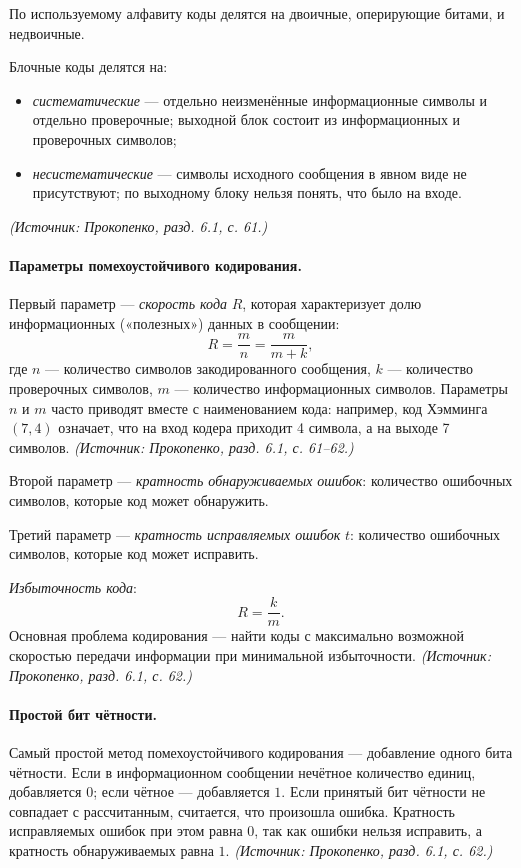 \documentclass[a4paper,12pt]{article}
\begin{document}
По используемому алфавиту коды делятся на двоичные, оперирующие битами, и недвоичные.

Блочные коды делятся на:
\begin{itemize}
\item \emph{систематические} — отдельно неизменённые информационные символы и отдельно проверочные; выходной блок состоит из информационных и проверочных символов;
\item \emph{несистематические} — символы исходного сообщения в явном виде не присутствуют; по выходному блоку нельзя понять, что было на входе.
\end{itemize}
\textit{(Источник: Прокопенко, разд. 6.1, с. 61.)}

\paragraph{Параметры помехоустойчивого кодирования.}
Первый параметр — \emph{скорость кода} \(R\), которая характеризует долю информационных («полезных») данных в сообщении:
\[
R=\frac{m}{n}=\frac{m}{m+k},
\]
где \(n\) — количество символов закодированного сообщения, \(k\) — количество проверочных символов, \(m\) — количество информационных символов. Параметры \(n\) и \(m\) часто приводят вместе с наименованием кода: например, код Хэмминга \((7,4)\) означает, что на вход кодера приходит 4 символа, а на выходе 7 символов.
\textit{(Источник: Прокопенко, разд. 6.1, с. 61--62.)}

Второй параметр — \emph{кратность обнаруживаемых ошибок}: количество ошибочных символов, которые код может обнаружить.

Третий параметр — \emph{кратность исправляемых ошибок} \(t\): количество ошибочных символов, которые код может исправить.

\emph{Избыточность кода}:
\[
R=\frac{k}{m}.
\]
Основная проблема кодирования — найти коды с максимально возможной скоростью передачи информации при минимальной избыточности.
\textit{(Источник: Прокопенко, разд. 6.1, с. 62.)}

\paragraph{Простой бит чётности.}
Самый простой метод помехоустойчивого кодирования — добавление одного бита чётности. Если в информационном сообщении нечётное количество единиц, добавляется \(0\); если чётное — добавляется \(1\). Если принятый бит чётности не совпадает с рассчитанным, считается, что произошла ошибка. Кратность исправляемых ошибок при этом равна \(0\), так как ошибки нельзя исправить, а кратность обнаруживаемых равна \(1\).
\textit{(Источник: Прокопенко, разд. 6.1, с. 62.)}
\end{document}
